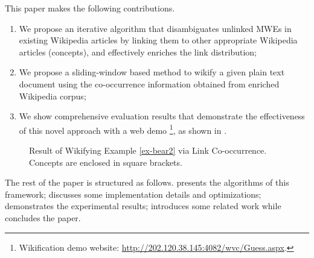 This paper makes the following contributions.
\begin{enumerate}
\item We propose an iterative algorithm that disambiguates
unlinked MWEs in existing Wikipedia articles
by linking them to other appropriate
Wikipedia articles (concepts), and effectively enriches the link
distribution;
\item We propose a sliding-window based method to wikify a given
plain text document using the co-occurrence information obtained from
enriched Wikipedia corpus;
\item We show comprehensive evaluation results that demonstrate the
effectiveness of this novel approach with a web demo
\footnote{Wikification demo website:
\url{http://202.120.38.145:4082/wvc/Guess.aspx}.},
as shown in .
\end{enumerate}

\begin{figure}
\centering
{}
\caption{Result of Wikifying Example \ref{ex-bear2} via Link Co-occurrence.
Concepts are enclosed in square brackets.}
\label{fig:screen-bear}
\end{figure}

The rest of the paper is structured as follows.
 presents
the algorithms of this framework;
 discusses some implementation
details and optimizations;
 demonstrates the experimental results;
 introduces some related work while
 concludes the paper.


%
%
%
%
%
%

